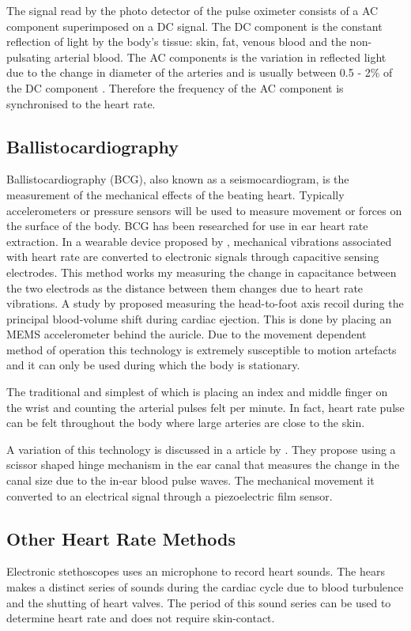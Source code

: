 The signal read by the photo detector of the pulse oximeter consists of a AC component superimposed on a DC signal. The DC component is the constant reflection of light by the body's tissue: skin, fat, venous blood and the non-pulsating arterial blood. The AC components is the variation in reflected light due to the change in diameter of the arteries and is usually between 0.5 - 2\% of the DC component  \citep{tavakoli2006analog}. Therefore the frequency of the AC component is synchronised to the heart rate.

\subsection{Ballistocardiography}
Ballistocardiography (BCG), also known as a seismocardiogram, is the measurement of the mechanical effects of the beating heart. Typically accelerometers or pressure sensors will be used to measure movement or forces on the surface of the body. BCG has been researched for use in ear heart rate extraction. In a wearable device proposed by \cite{da2010ear}, mechanical vibrations associated with heart rate are converted to electronic signals through capacitive sensing electrodes. This method works my measuring the change in capacitance between the two electrods as the distance between them changes due to heart rate vibrations. A study by \cite{winokur2012wearable} proposed measuring the head-to-foot axis recoil during the principal blood-volume shift during cardiac ejection. This is done by placing an MEMS accelerometer behind the auricle. Due to the movement dependent method of operation this technology is extremely susceptible to motion artefacts and it can only be used during which the body is stationary.


The traditional and simplest of which is placing an index and middle finger on the wrist and counting the arterial pulses felt per minute. In fact, heart rate pulse can be felt throughout the body where large arteries are close to the skin.

A variation of this technology is discussed in a article by \cite{park2015wearable}. They propose using a scissor shaped hinge mechanism in the ear canal that measures the change in the canal size due to the in-ear blood pulse waves. The mechanical movement it converted to an electrical signal through a piezoelectric film sensor.

\subsection{Other Heart Rate Methods}
Electronic stethoscopes uses an microphone to record heart sounds. The hears makes a distinct series of sounds during the cardiac cycle due to blood turbulence and the shutting of heart valves. The period of this sound series can be used to determine heart rate and does not require skin-contact.

